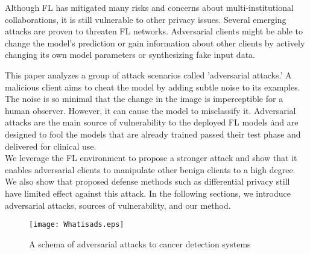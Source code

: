 Although FL has mitigated many risks and concerns about multi-institutional collaborations, it is still vulnerable to other privacy issues. Several emerging attacks are proven to threaten FL networks. Adversarial clients might be able to change the model's prediction or gain information about other clients by actively changing its own model parameters or synthesizing fake input data.





This paper analyzes a group of attack scenarios called 'adversarial attacks.' A malicious client aims to cheat the model by adding subtle noise to its examples. The noise is so minimal that the change in the image is imperceptible for a human observer. However, it can cause the model to misclassify it. 
Adversarial attacks are the main source of vulnerability to the deployed FL models \cite{bouacida2021vulnerabilities,lyu2020threats,costa2021covert,lyu2020privacy}\. and are designed to fool the models that  are already trained 
passed their test phase and delivered for clinical use. 
\\We leverage the FL environment to propose a stronger attack and show that it enables adversarial clients to manipulate other benign clients to a high degree.  
We also show that proposed defense methods such as differential privacy still have limited effect against this attack.
In the following sections, we introduce adversarial attacks, sources of vulnerability, and our method.

\begin{figure}[t!]
 \centering
 \texttt{[image: Whatisads.eps]}
 \caption{A schema of adversarial attacks to cancer detection systems}
 \label{fig:pgd-atta-comparison}
\end{figure}
 
 

